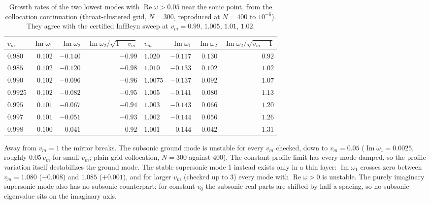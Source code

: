 \documentclass[11pt]{article}
\newcommand{\Real}{\operatorname{Re}}
\newcommand{\Imag}{\operatorname{Im}}
\newcommand{\infbeyn}{InfBeyn}
\begin{document}
\begin{table}[H]\centering\footnotesize
\begin{tabular}{lrrr@{\qquad}lrrr}
\toprule
$v_m$ & $\Imag\omega_1$ & $\Imag\omega_2$ & $\Imag\omega_2/\sqrt{1-v_m}$ &
$v_m$ & $\Imag\omega_1$ & $\Imag\omega_2$ & $\Imag\omega_2/\sqrt{v_m-1}$\\
\midrule
$0.980$ & $0.102$ & $-0.140$ & $-0.99$ & $1.020$ & $-0.117$ & $0.130$ & $0.92$\\
$0.985$ & $0.102$ & $-0.120$ & $-0.98$ & $1.010$ & $-0.133$ & $0.102$ & $1.02$\\
$0.990$ & $0.102$ & $-0.096$ & $-0.96$ & $1.0075$ & $-0.137$ & $0.092$ & $1.07$\\
$0.9925$ & $0.102$ & $-0.082$ & $-0.95$ & $1.005$ & $-0.141$ & $0.080$ & $1.13$\\
$0.995$ & $0.101$ & $-0.067$ & $-0.94$ & $1.003$ & $-0.143$ & $0.066$ & $1.20$\\
$0.997$ & $0.101$ & $-0.051$ & $-0.93$ & $1.002$ & $-0.144$ & $0.056$ & $1.26$\\
$0.998$ & $0.100$ & $-0.041$ & $-0.92$ & $1.001$ & $-0.144$ & $0.042$ & $1.31$\\
\bottomrule
\end{tabular}
\caption{Growth rates of the two lowest modes with $\Real\omega>0.05$ near the sonic point, from the collocation
continuation (throat-clustered grid, $N=300$, reproduced at $N=400$ to $10^{-6}$). They agree with the certified
\infbeyn{} sweep at $v_m=0.99$, $1.005$, $1.01$, $1.02$.}
\label{tab:neutral}
\end{table}

Away from $v_m=1$ the mirror breaks. The subsonic ground mode is unstable for every $v_m$ checked, down to
$v_m=0.05$ ($\Imag\omega_1=0.0025$, roughly $0.05\,v_m$ for small $v_m$; plain-grid collocation, $N=300$
against $400$). The constant-profile limit has every mode damped, so the profile variation itself destabilizes
the ground mode. The stable supersonic mode 1 instead exists only in a thin layer: $\Imag\omega_1$ crosses zero
between $v_m=1.080$ ($-0.008$) and $1.085$ ($+0.001$), and for larger $v_m$ (checked up to $3$) every mode with
$\Real\omega>0$ is unstable. The purely imaginary supersonic mode also has no subsonic counterpart: for constant
$v_0$ the subsonic real parts are shifted by half a spacing, so no subsonic eigenvalue sits on the imaginary axis.
\end{document}
